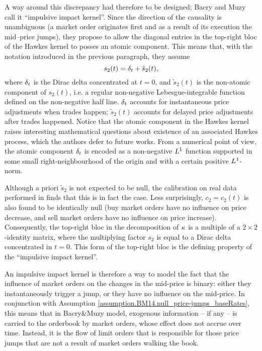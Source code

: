 \documentclass[10pt]{article}
\begin{document}
A way around this discrepancy had therefore to be designed; Bacry and Muzy call it ``impulsive impact kernel''. 
Since the direction of the causality is unambiguous (a market order originates first and as a result of its execution the mid--price jumps), they propose to allow the diagonal entries in the top-right bloc of the Hawkes kernel to posses an atomic component. This means that,  with the notation introduced in the previous paragraph, they assume 
\begin{equation*}
 s_2(t) = \delta_t + \tilde{s}_2(t),
\end{equation*}
where $\delta_t$ is the Dirac delta concentrated at $t=0$, and $\tilde{s}_2 (t)$ is the non-atomic component of $s_2(t)$, i.e. a regular non-negative Lebesgue-integrable function defined on the non-negative half line. $\delta_t$ accounts for instantaneous price adjustments when trades happen; $\tilde{s}_2 (t)$ accounts for delayed price adjustments after trades happened. Notice that the atomic component in the Hawkes kernel raises interesting mathematical questions about existence of an associated Hawkes process, which the authors defer to future works. From a numerical point of view, the atomic component $\delta_t$ is encoded as a non-negative $L^{1}$ function supported in some small right-neighbourhood of the origin and  with a certain positive $L^{1}$-norm. 

Although a priori $\tilde{s}_2$ is not expected to be null, the calibration on real data performed in \citealp{BM14haw} finds that this is in fact the  case. Less surprisingly, $c_2 = c_2 (t)$ is also found to be identically null (buy market orders have no influence on price decrease, and sell market orders have no influence on price increase).  Consequently, the top-right bloc in the decomposition of $\kappa$ is a multiple of a $2\times2$-identity matrix, where the multiplying factor $s_2$ is equal to a Dirac delta concentrated in $t=0$. This form of the top-right bloc is the defining property of the ``impulsive impact kernel''. 

An impulsive impact kernel is therefore a way to model the fact that the influence of market orders on the changes in the mid-price is binary: either they instantaneously trigger a jump, or they have no influence on the mid-price.  In conjunction with Assumption \ref{assumption.BM14.null_price-jumps_baseRates}, this means that in Bacry\&Muzy model, exogenous information -- if any -- is carried to the orderbook by market orders, whose effect does not accrue over time. Instead, it is the flow of limit orders that is responsible for those price jumps that are not a result of market orders walking the book.
\end{document}
